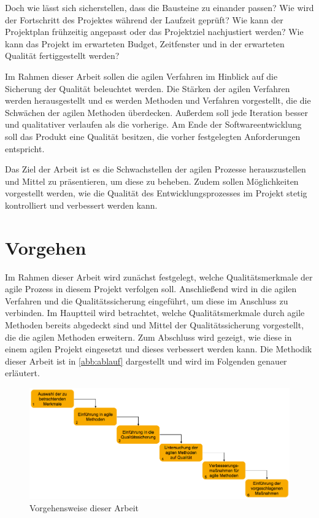         Doch wie lässt sich sicherstellen, dass die Bausteine zu einander passen? Wie wird der Fortschritt des Projektes während der Laufzeit geprüft? Wie kann der Projektplan frühzeitig angepasst oder das Projektziel nachjustiert werden? Wie kann das Projekt im erwarteten Budget, Zeitfenster und in der erwarteten Qualität fertiggestellt werden?

        Im Rahmen dieser Arbeit sollen die agilen Verfahren im Hinblick auf die Sicherung der Qualität beleuchtet werden. Die Stärken der agilen Verfahren werden herausgestellt und es werden Methoden und Verfahren vorgestellt, die die Schwächen der agilen Methoden überdecken. Außerdem soll jede Iteration besser und qualitativer verlaufen als die vorherige. Am Ende der Softwareentwicklung soll das Produkt eine Qualität besitzen, die vorher festgelegten Anforderungen entspricht.

        Das Ziel der Arbeit ist es die Schwachstellen der agilen Prozesse herauszustellen und Mittel zu präsentieren, um diese zu beheben. Zudem sollen Möglichkeiten vorgestellt werden, wie die Qualität des Entwicklungsprozesses im Projekt stetig kontrolliert und verbessert werden kann.

    \section{Vorgehen}
    \label{sec:vorgehen}

        Im Rahmen dieser Arbeit wird zunächst festgelegt, welche Qualitätsmerkmale der agile Prozess in diesem Projekt verfolgen soll. Anschließend wird in die agilen Verfahren und die Qualitätssicherung eingeführt, um diese im Anschluss zu verbinden. Im Hauptteil wird betrachtet, welche Qualitätsmerkmale durch agile Methoden bereits abgedeckt sind und Mittel der Qualitätssicherung vorgestellt, die die agilen Methoden erweitern. Zum Abschluss wird gezeigt, wie diese in einem agilen Projekt eingesetzt und dieses verbessert werden kann. Die Methodik dieser Arbeit ist in \autoref{abb:ablauf} dargestellt und wird im Folgenden genauer erläutert.

        \begin{figure}[htbp]
                \begin{center}
                    \includegraphics[width=\textwidth]{Abbildungen/ablauf}
                    \caption{Vorgehensweise dieser Arbeit}
                    \label{abb:ablauf}
                \end{center}
        \end{figure}

